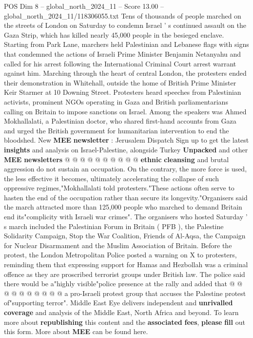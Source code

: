 \begin{textsample}{POS Dim 8 – global\_north\_2024\_11 – Score 13.00 – global\_north\_2024\_11/118306055.txt}  \label{ex:f8_pos_057}
Tens of thousands of people marched on the streets of London on Saturday to condemn Israel ' s continued assault on the Gaza Strip, which has killed nearly 45,000 people in the besieged enclave.
Starting from Park Lane, marchers held Palestinian and Lebanese flags with signs that condemned the actions of Israeli Prime Minister Benjamin Netanyahu and called for his arrest following the International Criminal Court arrest warrant against him.
Marching through the heart of central London, the protesters ended their demonstration in Whitehall, outside the home of British Prime Minister Keir Starmer at 10 Downing Street.
Protesters heard speeches from Palestinian activists, prominent NGOs operating in Gaza and British parliamentarians calling on Britain to impose sanctions on Israel.
Among the speakers was Ahmed Mokhallalati, a Palestinian doctor, who shared first-hand accounts from Gaza and urged the British government for humanitarian intervention to end the bloodshed.
New \textbf{MEE} \textbf{newsletter} : Jerusalem Dispatch Sign up to get the latest \textbf{insights} and analysis on Israel-Palestine, alongside Turkey \textbf{Unpacked} and other \textbf{MEE} \textbf{newsletters} @ @ @ @ @ @ @ @ @ @ \textbf{ethnic} \textbf{cleansing} and brutal aggression do not sustain an occupation.
On the contrary, the more force is used, the less effective it becomes, ultimately accelerating the collapse of such oppressive regimes,"Mokhallalati told protesters."These actions often serve to hasten the end of the occupation rather than secure its longevity."Organisers said the march attracted more than 125,000 people who marched to demand Britain end its"complicity with Israeli war crimes".
The organisers who hosted Saturday ' s march included the Palestinian Forum in Britain ( PFB ), the Palestine Solidarity Campaign, Stop the War Coalition, Friends of Al-Aqsa, the Campaign for Nuclear Disarmament and the Muslim Association of Britain.
Before the protest, the London Metropolitan Police posted a warning on X to protesters, reminding them that expressing support for Hamas and Hezbollah was a criminal offence as they are proscribed terrorist groups under British law.
The police said there would be a"highly visible"police presence at the rally and added that @ @ @ @ @ @ @ @ @ @ a pro-Israeli protest group that accuses the Palestine protest of"supporting terror".
Middle East Eye delivers independent and \textbf{unrivalled} \textbf{coverage} and analysis of the Middle East, North Africa and beyond.
To learn more about \textbf{republishing} this content and the \textbf{associated} \textbf{fees}, \textbf{please} \textbf{fill} out this form.
More about \textbf{MEE} can be found here.

\end{textsample}
